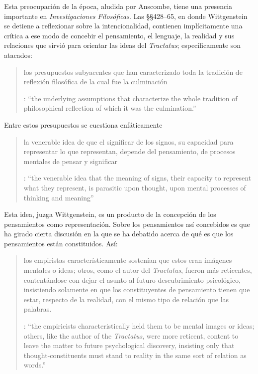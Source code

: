 Esta preocupación de la época, aludida por Anscombe, tiene una presencia importante en \emph{Investigaciones Filosóficas}. Las \S\S428--65, en donde Wittgenstein se detiene a reflexionar sobre la intencionalidad, contienen implícitamente una crítica a ese modo de concebir el pensamiento, el lenguaje, la realidad y sus relaciones que sirvió para orientar las ideas del \emph{Tractatus}; específicamente son atacados: \blockquote[{\cite[3]{hacker2000mind}}: \enquote{the underlying assumptions that characterize the whole tradition of philosophical reflection of which it was the culmination.}]{los presupuestos subyacentes que han caracterizado toda la tradición de reflexión filosófica de la cual  fue la culminación}. Entre estos presupuestos se cuestiona enfáticamente \blockquote[{\cite[3]{hacker2000mind}}: \enquote{the venerable idea that the meaning of signs, their capacity to represent what they represent, is parasitic upon thought, upon mental processes of thinking and meaning}]{la venerable idea de que el significar de los signos, su capacidad para representar lo que representan, depende del pensamiento, de procesos mentales de pensar y significar}. Esta idea, juzga Wittgenstein, es un producto de la concepción de los pensamientos como representación. Sobre los pensamientos así concebidos es que ha girado cierta discusión en la que se ha debatido acerca de qué es que los pensamientos están constituidos. Así: \blockquote[{\cite[3]{hacker2000mind}}: \enquote{the empiricists characteristically held them to be mental images or ideas; others, like the author of the \emph{Tractatus}, were more reticent, content to leave the matter to future psychological discovery, insisting only that thought-constituents must stand to reality in the same sort of relation as words.}]{los empiristas característicamente sostenían que estos eran imágenes mentales o ideas; otros, como el autor del \emph{Tractatus}, fueron más reticentes, contentándose con dejar el asunto al futuro descubrimiento psicológico, insistiendo solamente en que los constituyentes de pensamiento tienen que estar, respecto de la realidad, con el mismo tipo de relación que las palabras.}

